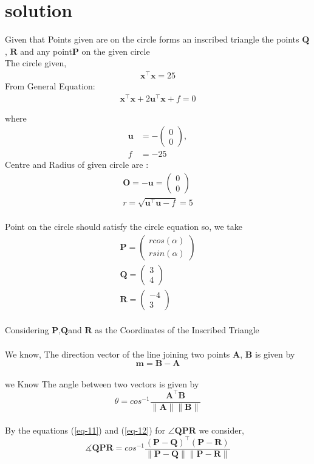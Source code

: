 \documentclass[journal,12pt,twocolumn]{article}
\newcommand{\myvec}[1]{\ensuremath{\begin{pmatrix}#1\end{pmatrix}}}
\let\vec\mathbf
\begin{document}
\section{solution}
Given that Points given are on the circle forms an inscribed triangle the points $\vec{Q}$, $\vec{R}$ and any point$\vec{P}$ on the given circle   \\

The circle given,
 \begin{align}
    \label{eq:conic_quad_form}
    \vec{x}^{\top}\vec{x}=25
 \end{align}
From General Equation:
\begin{align}
    \label{eq:conic_quad_form}
    \vec{x}^{\top}\vec{x}+2\vec{u}^{\top}\vec{x}+f=0
    \end{align}
    
where
\begin{align}
	\label{eq:u_vector}
	\vec{u} &= -\myvec{0\\0},
	\\
	\label{eq:f_value}
	f &= -25	
\end{align}
Centre and Radius of given circle are :
\begin{align}
	\label{eq:V_matrix}
	\vec{O} = -\vec{u} = \myvec{0\\0}\\
	r = \sqrt{\vec{u}^{\top}\vec{u}-f} = 5
	 \label{eq-7} 
\end{align}
\\
Point on the circle should satisfy the circle equation so, we take 
\begin{align}
\vec{P}=\myvec{rcos(\alpha)\\
  rsin(\alpha)}\\
 \vec{Q}=\myvec{3\\
  4}\\
   \vec{R}=\myvec{-4\\
  3}
\end{align}
\\
Considering $\vec{P}$,$\vec{Q}$and $\vec{R}$ as the Coordinates of the Inscribed Triangle
\\
\\
We know,
The direction vector of the line joining two points $\vec{A}$, $\vec{B}$ is given by
\begin{equation}
	\vec{m}=
     \vec{B}-  \vec{A}
  \label{eq-11}
\end{equation}
\\
we Know
The angle between two vectors is given by
\begin{equation}
\theta = {cos}^{-1}\frac{\vec{A^{\top}} \vec{B}}{\vec{\|A\| \|B\|}}
   \label{eq-12}
\end{equation}
\\
By the equations (\ref{eq-11}) and (\ref{eq-12}) for $\vec{\angle{QPR}}$ we consider,
\begin{equation}
	\vec{\measuredangle{QPR}} = {cos}^{-1}\frac{(\vec{P-Q})^{\top} (\vec{P-R})}{\vec{\|P-Q\| \|P-R\|}}
   \label{eq-14}
\end{equation}
\end{document}

